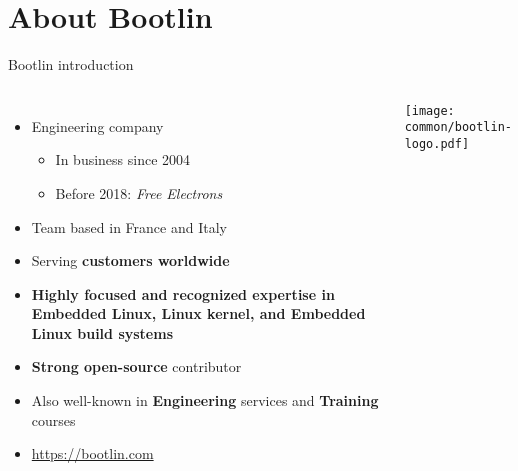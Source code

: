 \section*{About Bootlin}

\begin{frame}{Bootlin introduction}
  \begin{columns}[T]
  \begin{itemize}
  \item Engineering company
    \begin{itemize}
    \item In business since 2004
    \item Before 2018: {\em Free Electrons}
    \end{itemize}
  \item Team based in France and Italy
  \item Serving {\bf customers worldwide}
  \item {\bf Highly focused and recognized expertise in Embedded Linux, Linux kernel, and Embedded Linux build systems}
  \item {\bf Strong open-source} contributor
  \item Also well-known in {\bf Engineering} services and {\bf Training} courses
  \item {\small \url{https://bootlin.com}}
  \end{itemize}
  \begin{center}
    \texttt{[image: common/bootlin-logo.pdf]}
  \end{center}
  \end{columns}
\end{frame}

